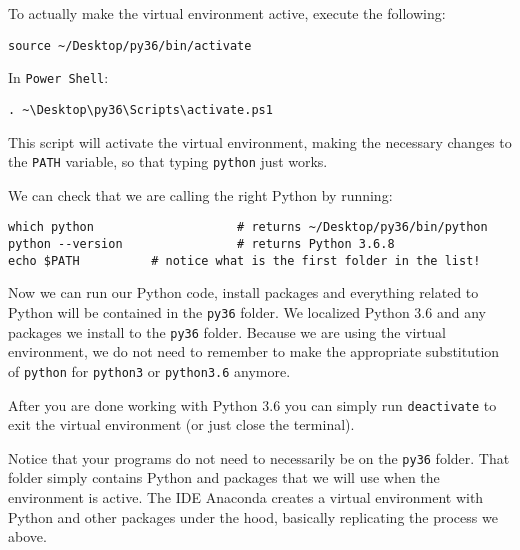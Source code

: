 \documentclass[12pt, a4paper]{article}
\begin{document}
To actually make the virtual environment active, execute the following:
\lstset{language=bash,label= ,caption= ,captionpos=b,firstnumber=1,numbers=left,style=bash}
\begin{lstlisting}
source ~/Desktop/py36/bin/activate
\end{lstlisting}
In \texttt{Power Shell}:
\lstset{language=bash,label= ,caption= ,captionpos=b,firstnumber=1,numbers=left,style=powershell}
\begin{lstlisting}
. ~\Desktop\py36\Scripts\activate.ps1
\end{lstlisting}
This script will activate the virtual environment, making the necessary changes to the \texttt{PATH} variable, so that typing \texttt{python} just works.

We can check that we are calling the right Python by running:
\lstset{language=bash,label= ,caption= ,captionpos=b,firstnumber=1,numbers=left,style=bash}
\begin{lstlisting}
which python                    # returns ~/Desktop/py36/bin/python
python --version                # returns Python 3.6.8
echo $PATH			# notice what is the first folder in the list!
\end{lstlisting}
Now we can run our Python code, install packages and everything related to Python will be contained in the \texttt{py36} folder.
We localized Python 3.6 and any packages we install to the \texttt{py36} folder.
Because we are using the virtual environment, we do not need to remember to make the appropriate substitution of \texttt{python} for \texttt{python3} or \texttt{python3.6} anymore.

After you are done working with Python 3.6 you can simply run \texttt{deactivate} to exit the virtual environment (or just close the terminal).

Notice that your programs do not need to necessarily be on the \texttt{py36} folder.
That folder simply contains Python and packages that we will use when the environment is active.
The IDE Anaconda creates a virtual environment with Python and other packages under the hood, basically replicating the process we above.
\end{document}
